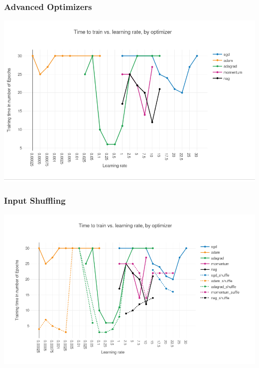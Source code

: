 \begin{frame}
\frametitle{Advanced Optimizers}
\includegraphics[scale=0.4]{images/results_optim}
\end{frame}
\begin{frame}
\frametitle{Input Shuffling}
\includegraphics[scale=0.4]{images/results_shuffle}
\end{frame}